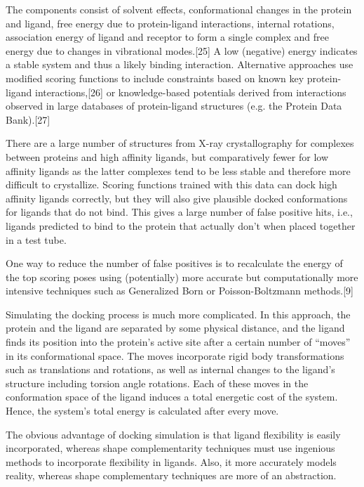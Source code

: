 The components consist of solvent effects, conformational changes in the protein and ligand, free energy due to protein-ligand interactions, internal rotations, association energy of ligand and receptor to form a single complex and free energy due to changes in vibrational modes.[25] A low (negative) energy indicates a stable system and thus a likely binding interaction.
Alternative approaches use modified scoring functions to include constraints based on known key protein-ligand interactions,[26] or knowledge-based potentials derived from interactions observed in large databases of protein-ligand structures (e.g. the Protein Data Bank).[27]

There are a large number of structures from X-ray crystallography for complexes between proteins and high affinity ligands, but comparatively fewer for low affinity ligands as the latter complexes tend to be less stable and therefore more difficult to crystallize. Scoring functions trained with this data can dock high affinity ligands correctly, but they will also give plausible docked conformations for ligands that do not bind. This gives a large number of false positive hits, i.e., ligands predicted to bind to the protein that actually don't when placed together in a test tube.

One way to reduce the number of false positives is to recalculate the energy of the top scoring poses using (potentially) more accurate but computationally more intensive techniques such as Generalized Born or Poisson-Boltzmann methods.[9]

Simulating the docking process is much more complicated. In this approach, the protein and the ligand are separated by some physical distance, and the ligand finds its position into the protein's active site after a certain number of “moves” in its conformational space. The moves incorporate rigid body transformations such as translations and rotations, as well as internal changes to the ligand's structure including torsion angle rotations. Each of these moves in the conformation space of the ligand induces a total energetic cost of the system. Hence, the system's total energy is calculated after every move.

The obvious advantage of docking simulation is that ligand flexibility is easily incorporated, whereas shape complementarity techniques must use ingenious methods to incorporate flexibility in ligands. Also, it more accurately models reality, whereas shape complementary techniques are more of an abstraction.

